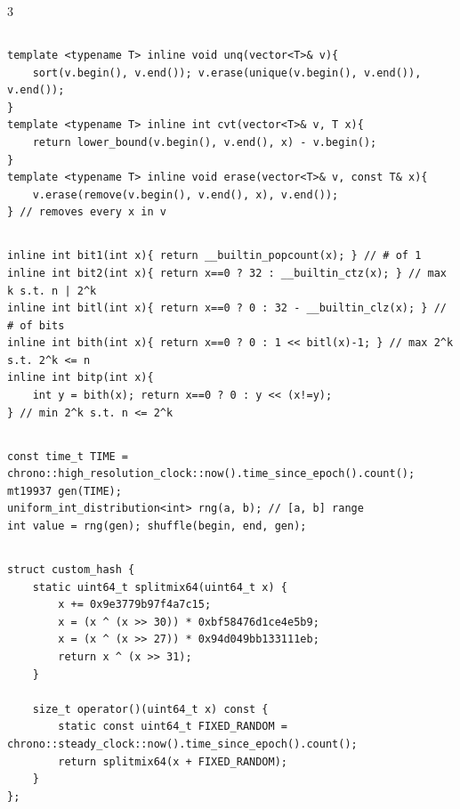 \documentclass[landscape, 8pt, a4paper, oneside]{extarticle}
\begin{document}
\begin{multicols*}{3}
\subsection{}
\begin{verbatim}
template <typename T> inline void unq(vector<T>& v){
	sort(v.begin(), v.end()); v.erase(unique(v.begin(), v.end()), v.end());
}
template <typename T> inline int cvt(vector<T>& v, T x){
	return lower_bound(v.begin(), v.end(), x) - v.begin();
}
template <typename T> inline void erase(vector<T>& v, const T& x){
	v.erase(remove(v.begin(), v.end(), x), v.end());
} // removes every x in v
\end{verbatim}
\subsection{}
\begin{verbatim}
inline int bit1(int x){ return __builtin_popcount(x); } // # of 1
inline int bit2(int x){ return x==0 ? 32 : __builtin_ctz(x); } // max k s.t. n | 2^k
inline int bitl(int x){ return x==0 ? 0 : 32 - __builtin_clz(x); } // # of bits
inline int bith(int x){ return x==0 ? 0 : 1 << bitl(x)-1; } // max 2^k s.t. 2^k <= n
inline int bitp(int x){
	int y = bith(x); return x==0 ? 0 : y << (x!=y);
} // min 2^k s.t. n <= 2^k
\end{verbatim}
\subsection{}
\begin{verbatim}
const time_t TIME = chrono::high_resolution_clock::now().time_since_epoch().count();
mt19937 gen(TIME);
uniform_int_distribution<int> rng(a, b); // [a, b] range
int value = rng(gen); shuffle(begin, end, gen);
\end{verbatim}
\subsection{}
\begin{verbatim}
struct custom_hash {
	static uint64_t splitmix64(uint64_t x) {
		x += 0x9e3779b97f4a7c15;
		x = (x ^ (x >> 30)) * 0xbf58476d1ce4e5b9;
		x = (x ^ (x >> 27)) * 0x94d049bb133111eb;
		return x ^ (x >> 31);
	}

	size_t operator()(uint64_t x) const {
		static const uint64_t FIXED_RANDOM = chrono::steady_clock::now().time_since_epoch().count();
		return splitmix64(x + FIXED_RANDOM);
	}
};


\end{verbatim}
\end{multicols*}
\end{document}
